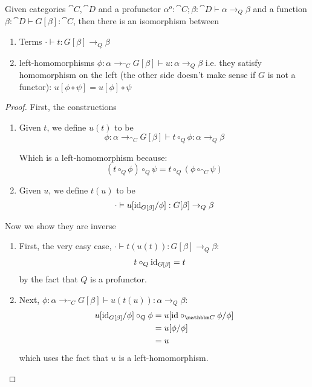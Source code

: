 \documentclass{article}
\begin{document}
\begin{lemma}
  Given categories $\cat C, \cat D$ and a profunctor $\alpha^o:\cat
  C;\beta : \cat D \vdash \alpha \to_{Q} \beta$ and a function
  $\beta : \cat D \vdash G[\beta] : \cat C$, then there is an
  isomorphism between
  \begin{enumerate}
  \item Terms $\cdot \vdash t : G[\beta] \to_{Q} \beta$
  \item left-homomorphisms $\phi : \alpha \to_{\cat C} G[\beta] \vdash
    u : \alpha \to_{Q} \beta$ i.e. they satisfy homomorphism on the
    left (the other side doesn't make sense if $G$ is not a functor):
    $u[\phi \circ \psi] = u[\phi] \circ \psi$
  \end{enumerate}
\end{lemma}
\begin{proof}
  First, the constructions
  \begin{enumerate}
  \item Given $t$, we define $u(t)$ to be
    \[\phi : \alpha \to_{\cat C} G[\beta] \vdash t \circ_{Q} \phi : \alpha \to_{Q} \beta\]

    Which is a left-homomorphism because:
    \[ (t \circ_{Q} \phi) \circ_{Q} \psi = t \circ_{Q} (\phi \circ_{\cat C} \psi)\]
  \item Given $u$, we define $t(u)$ to be
    \[ \cdot \vdash u[\textrm{id}_{G[\beta]}/\phi] : G[\beta] \to_{Q} \beta \]
  \end{enumerate}
  Now we show they are inverse
  \begin{enumerate}
  \item First, the very easy case, $\cdot \vdash t(u(t)) : G[\beta] \to_{Q} \beta$:
    \begin{align*}
      t \circ_{Q} \textrm{id}_{G[\beta]} &= t
    \end{align*}
    by the fact that $Q$ is a profunctor.
  \item Next, $\phi : \alpha \to_{\cat C} G[\beta] \vdash u(t(u)) : \alpha \to_{Q} \beta$:
    \begin{align*}
      u[\id_{G[\beta]}/\phi] \circ_{Q} \phi &= u[\id \circ_{\cat C} \phi/\phi]\\
      &= u[\phi/\phi]\\
      &= u
    \end{align*}
    which uses the fact that $u$ is a left-homomorphism.
  \end{enumerate}
\end{proof}
\end{document}
